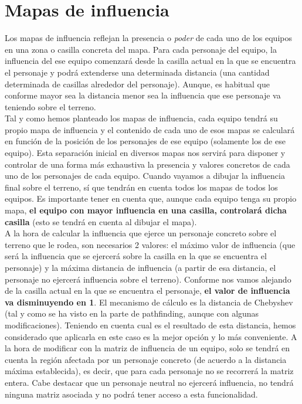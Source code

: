 \medskip
\section{Mapas de influencia}
\label{mapas-influencia}
Los mapas de influencia reflejan la presencia o \textit{poder} de cada uno de los equipos en una zona o casilla concreta del mapa. Para cada personaje del equipo, la influencia del ese equipo comenzará desde la casilla actual en la que se encuentra el personaje y podrá extenderse una determinada distancia (una cantidad determinada de casillas alrededor del personaje). Aunque, es habitual que conforme mayor sea la distancia menor sea la influencia que ese personaje va teniendo sobre el terreno. \\

Tal y como hemos planteado los mapas de influencia, cada equipo tendrá su propio mapa de influencia y el contenido de cada uno de esos mapas se calculará en función de la posición de los personajes de ese equipo (solamente los de ese equipo). Esta separación inicial en diversos mapas nos servirá para disponer y controlar de una forma más exhaustiva la presencia y valores concretos de cada uno de los personajes de cada equipo. Cuando vayamos a dibujar la influencia final sobre el terreno, sí que tendrán en cuenta todos los mapas de todos los equipos. Es importante tener en cuenta que, aunque cada equipo tenga su propio mapa, \textbf{el equipo con mayor influencia en una casilla, controlará dicha casilla} (esto se tendrá en cuenta al dibujar el mapa). \\

A la hora de calcular la influencia que ejerce un personaje concreto sobre el terreno que le rodea, son necesarios 2 valores: el máximo valor de influencia (que será la influencia que se ejercerá sobre la casilla en la que se encuentra el personaje) y la máxima distancia de influencia (a partir de esa distancia, el personaje no ejercerá influencia sobre el terreno). Conforme nos vamos alejando de la casilla actual en la que se encuentra el personaje, \textbf{el valor de influencia va disminuyendo en 1}. El mecanismo de cálculo es la distancia de Chebyshev (tal y como se ha visto en la parte de pathfinding, aunque con algunas modificaciones). Teniendo en cuenta cual es el resultado de esta distancia, hemos considerado que aplicarla en este caso es la mejor opción y lo más conveniente. A la hora de modificar con la matriz de influencia de un equipo, solo se tendrá en cuenta la región afectada por un personaje concreto (de acuerdo a la distancia máxima establecida), es decir, que para cada personaje no se recorrerá la matriz entera. Cabe destacar que un personaje neutral no ejercerá influencia, no tendrá ninguna matriz asociada y no podrá tener acceso a esta funcionalidad. \\

